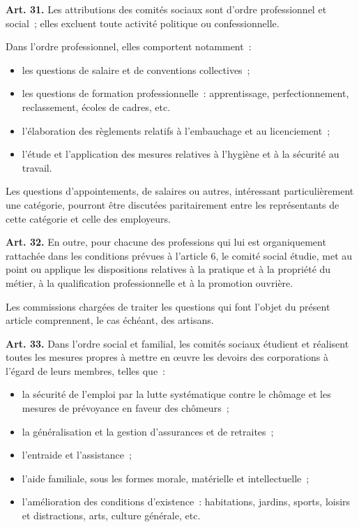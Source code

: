 \documentclass[french,twoside]{book} %
\newcommand{\labelchar}[1]{\textbf{\color{rubric} #1}}
\def\mednobreak{\ifdim\lastskip<\medskipamount
  \removelastskip\nopagebreak\medskip\fi}
\newcommand{\labelblock}[1]{\medbreak{\noindent\color{rubric}\bfseries #1}\par\mednobreak}
\begin{document}
\labelblock{Attributions des comités sociaux}

\noindent \labelchar{Art. 31.} Les attributions des comités sociaux sont d’ordre professionnel et social ; elles excluent toute activité politique ou confessionnelle.\par
Dans l’ordre professionnel, elles comportent notamment :\par

\begin{itemize}[itemsep=0pt,]
\item les questions de salaire et de conventions collectives ;
\item les questions de formation professionnelle : apprentissage, perfectionnement, reclassement, écoles de cadres, etc.
\item l’élaboration des règlements relatifs à l’embauchage et au licenciement ;
\item l’étude et l’application des mesures relatives à l’hygiène et à la sécurité au travail.
\end{itemize}

\noindent Les questions d’appointements, de salaires ou autres, intéressant particulièrement une catégorie, pourront être discutées paritairement entre les représentants de cette catégorie et celle des employeurs.\par
\bigbreak
\noindent \labelchar{Art. 32.} En outre, pour chacune des professions qui lui est organiquement rattachée dans les conditions prévues à l’article 6, le comité social étudie, met au point ou applique les dispositions relatives à la pratique et à la propriété du métier, à la qualification professionnelle et à la promotion ouvrière.\par
Les commissions chargées de traiter les questions qui font l’objet du présent article comprennent, le cas échéant, des artisans.\par
\bigbreak
\noindent \labelchar{Art. 33.} Dans l’ordre social et familial, les comités sociaux étudient et réalisent toutes les mesures propres à mettre en œuvre les devoirs des corporations à l’égard de leurs membres, telles que :\par

\begin{itemize}[itemsep=0pt,]
\item la sécurité de l’emploi par la lutte systématique contre le chômage et les mesures de prévoyance en faveur des chômeurs ;
\item la généralisation et la gestion d’assurances et de retraites ;
\item l’entraide et l’assistance ;
\item l’aide familiale, sous les formes morale, matérielle et intellectuelle ;
\item l’amélioration des conditions d’existence : habitations, jardins, sports, loisirs et distractions, arts, culture générale, etc.
\end{itemize}
\end{document}
